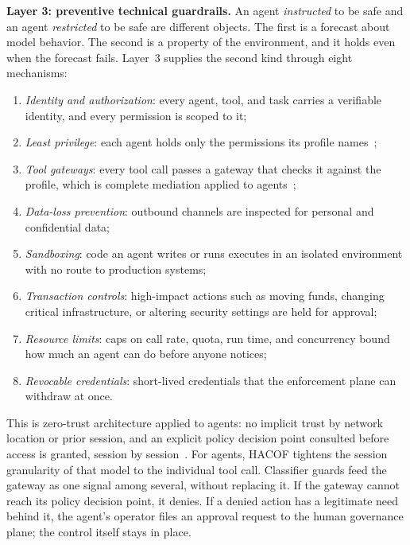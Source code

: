 \documentclass{ieeeaccess}
\newcommand{\hacof}{HACOF}
\begin{document}
\textbf{Layer 3: preventive technical guardrails.} An agent \textit{instructed} to be safe and an agent \textit{restricted} to be safe are different objects. The first is a forecast about model behavior. The second is a property of the environment, and it holds even when the forecast fails. Layer~3 supplies the second kind through eight mechanisms:
\begin{enumerate}
  \item \textit{Identity and authorization}: every agent, tool, and task carries a verifiable identity, and every permission is scoped to it;
  \item \textit{Least privilege}: each agent holds only the permissions its profile names~\cite{saltzer1975protection};
  \item \textit{Tool gateways}: every tool call passes a gateway that checks it against the profile, which is complete mediation applied to agents~\cite{saltzer1975protection};
  \item \textit{Data-loss prevention}: outbound channels are inspected for personal and confidential data;
  \item \textit{Sandboxing}: code an agent writes or runs executes in an isolated environment with no route to production systems;
  \item \textit{Transaction controls}: high-impact actions such as moving funds, changing critical infrastructure, or altering security settings are held for approval;
  \item \textit{Resource limits}: caps on call rate, quota, run time, and concurrency bound how much an agent can do before anyone notices;
  \item \textit{Revocable credentials}: short-lived credentials that the enforcement plane can withdraw at once.
\end{enumerate}
This is zero-trust architecture applied to agents: no implicit trust by network location or prior session, and an explicit policy decision point consulted before access is granted, session by session~\cite{nist2020zerotrust}.
For agents, \hacof{} tightens the session granularity of that model to the individual tool call. Classifier guards feed the gateway as one signal among several, without replacing it. If the gateway cannot reach its policy decision point, it denies. If a denied action has a legitimate need behind it, the agent's operator files an approval request to the human governance plane; the control itself stays in place.
\end{document}
